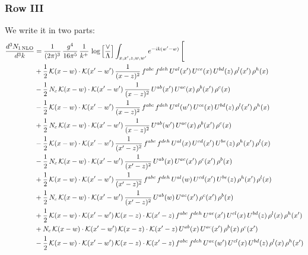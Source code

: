 \documentclass[9pt]{article}
\numberwithin{equation}{section}
\begin{document}
\subsubsection{Row III}
We write it in two parts: 
\begin{align}
\frac{d^{3}N_{1\,\mathrm{NLO}}}{d^{3}k} & = \frac{1}{(2\pi)^{3}}\,\frac{g^{4}}{16\pi^{5}}\,\frac{1}{k^{+}}\,\log\Big[\frac{\vee}{\Lambda}\Big]\int_{x,x',z,w,w'}e^{-ik(w'-w)}\,\Bigg[\notag\\ &  +\frac{1}{2}\,\mathcal{K}(x-w)\cdot\mathcal{K}(x'-w')\,\frac{1}{(x-z)^{2}}\,f^{abc}\,f^{deh}\,U^{al}(x')\,U^{ce}(x)\,U^{bd}(z)\,\rho^{l}(x')\,\rho^{h}(x)\notag\\
& -\frac{1}{2}\,N_{c}\,\mathcal{K}(x-w)\cdot\mathcal{K}(x'-w')\,\frac{1}{(x-z)^{2}}\,U^{ab}(x')\,U^{ac}(x)\,\rho^{b}(x')\,\rho^{c}(x)\notag\\
& -\frac{1}{2}\,\mathcal{K}(x-w)\cdot\mathcal{K}(x'-w')\,\frac{1}{(x-z)^{2}}\,f^{abc}\,f^{deh}\,U^{al}(w')\,U^{ce}(x)\,U^{bd}(z)\,\rho^{l}(x')\,\rho^{h}(x)\notag\\
& +\frac{1}{2}\,N_{c}\,\mathcal{K}(x-w)\cdot\mathcal{K}(x'-w')\,\frac{1}{(x-z)^{2}}\,U^{ab}(w')\,U^{ac}(x)\,\rho^{b}(x')\,\rho^{c}(x)\notag\\
& -\frac{1}{2}\,\mathcal{K}(x-w)\cdot\mathcal{K}(x'-w')\,\frac{1}{(x'-z)^{2}}\,f^{abc}\,f^{deh}\,U^{al}(x)\,U^{cd}(x')\,U^{be}(z)\,\rho^{h}(x')\,\rho^{l}(x)\notag\\
& -\frac{1}{2}\,N_{c}\,\mathcal{K}(x-w)\cdot\mathcal{K}(x'-w')\,\frac{1}{(x'-z)^{2}}\,U^{ab}(x)\,U^{ac}(x')\,\rho^{c}(x')\,\rho^{b}(x)\notag\\
& +\frac{1}{2}\,\mathcal{K}(x-w)\cdot\mathcal{K}(x'-w')\,\frac{1}{(x'-z)^{2}}\,f^{abc}\,f^{deh}\,U^{al}(w)\,U^{cd}(x')\,U^{be}(z)\,\rho^{h}(x')\,\rho^{l}(x)\notag\\
& +\frac{1}{2}\,N_{c}\,\mathcal{K}(x-w)\cdot\mathcal{K}(x'-w')\,\frac{1}{(x'-z)^{2}}\,U^{ab}(w)\,U^{ac}(x')\,\rho^{c}(x')\,\rho^{b}(x)\notag\\
& +\frac{1}{2}\,\mathcal{K}(x-w)\cdot\mathcal{K}(x'-w')\,\mathcal{K}(x-z)\cdot\mathcal{K}(x'-z)\,f^{abc}\,f^{deh}\,U^{ae}(x')\,U^{cl}(x)\,U^{bd}(z)\,\rho^{l}(x)\,\rho^{h}(x')\notag\\
& +N_{c}\,\mathcal{K}(x-w)\cdot\mathcal{K}(x'-w')\,\mathcal{K}(x-z)\cdot\mathcal{K}(x'-z)\,U^{ab}(x)\,U^{ac}(x')\,\rho^{b}(x)\,\rho^{c}(x')\notag\\
& -\frac{1}{2}\,\mathcal{K}(x-w)\cdot\mathcal{K}(x'-w')\,\mathcal{K}(x-z)\cdot\mathcal{K}(x'-z)\,f^{abc}\,f^{deh}\,U^{ae}(w')\,U^{cl}(x)\,U^{bd}(z)\,\rho^{l}(x)\,\rho^{h}(x')\notag\\

\end{align}
\end{document}

